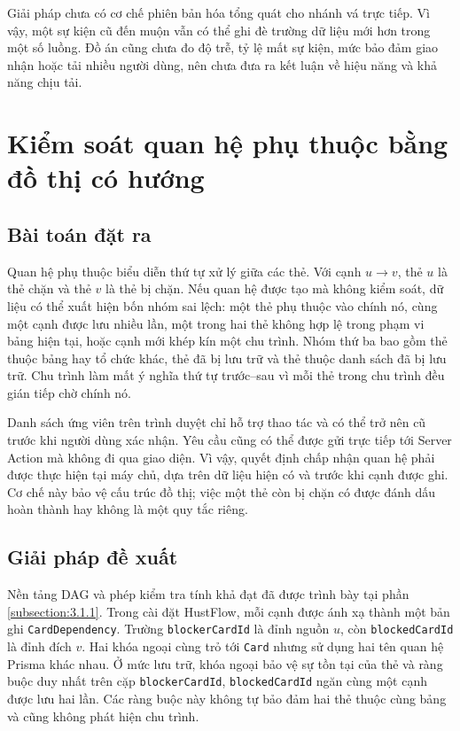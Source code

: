 \documentclass[../DoAn.tex]{subfiles}
\begin{document}
Giải pháp chưa có cơ chế phiên bản hóa tổng quát cho nhánh vá trực tiếp. Vì vậy, một sự kiện cũ đến muộn vẫn có thể ghi đè trường dữ liệu mới hơn trong một số luồng. Đồ án cũng chưa đo độ trễ, tỷ lệ mất sự kiện, mức bảo đảm giao nhận hoặc tải nhiều người dùng, nên chưa đưa ra kết luận về hiệu năng và khả năng chịu tải.

\section{Kiểm soát quan hệ phụ thuộc bằng đồ thị có hướng}
\label{section:5.2}

\subsection{Bài toán đặt ra}
\label{subsection:5.2.1}

Quan hệ phụ thuộc biểu diễn thứ tự xử lý giữa các thẻ. Với cạnh \(u \rightarrow v\), thẻ \(u\) là thẻ chặn và thẻ \(v\) là thẻ bị chặn. Nếu quan hệ được tạo mà không kiểm soát, dữ liệu có thể xuất hiện bốn nhóm sai lệch: một thẻ phụ thuộc vào chính nó, cùng một cạnh được lưu nhiều lần, một trong hai thẻ không hợp lệ trong phạm vi bảng hiện tại, hoặc cạnh mới khép kín một chu trình. Nhóm thứ ba bao gồm thẻ thuộc bảng hay tổ chức khác, thẻ đã bị lưu trữ và thẻ thuộc danh sách đã bị lưu trữ. Chu trình làm mất ý nghĩa thứ tự trước--sau vì mỗi thẻ trong chu trình đều gián tiếp chờ chính nó.

Danh sách ứng viên trên trình duyệt chỉ hỗ trợ thao tác và có thể trở nên cũ trước khi người dùng xác nhận. Yêu cầu cũng có thể được gửi trực tiếp tới Server Action mà không đi qua giao diện. Vì vậy, quyết định chấp nhận quan hệ phải được thực hiện tại máy chủ, dựa trên dữ liệu hiện có và trước khi cạnh được ghi. Cơ chế này bảo vệ cấu trúc đồ thị; việc một thẻ còn bị chặn có được đánh dấu hoàn thành hay không là một quy tắc riêng.

\subsection{Giải pháp đề xuất}
\label{subsection:5.2.2}

Nền tảng DAG và phép kiểm tra tính khả đạt đã được trình bày tại phần \ref{subsection:3.1.1}. Trong cài đặt HustFlow, mỗi cạnh được ánh xạ thành một bản ghi \texttt{CardDependency}. Trường \texttt{blockerCardId} là đỉnh nguồn \(u\), còn \texttt{blockedCardId} là đỉnh đích \(v\). Hai khóa ngoại cùng trỏ tới \texttt{Card} nhưng sử dụng hai tên quan hệ Prisma khác nhau. Ở mức lưu trữ, khóa ngoại bảo vệ sự tồn tại của thẻ và ràng buộc duy nhất trên cặp \texttt{blockerCardId}, \texttt{blockedCardId} ngăn cùng một cạnh được lưu hai lần. Các ràng buộc này không tự bảo đảm hai thẻ thuộc cùng bảng và cũng không phát hiện chu trình.
\end{document}
